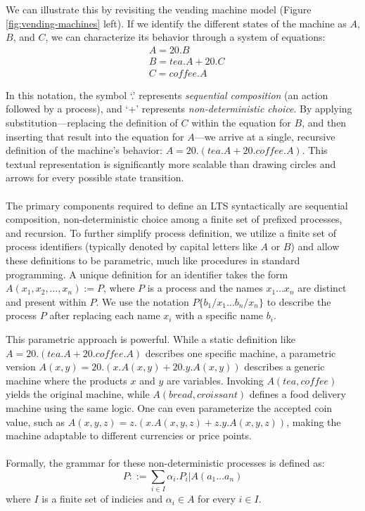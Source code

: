 We can illustrate this by revisiting the vending machine model (Figure \ref{fig:vending-machines} left). If we identify the different states of the machine as $A$, $B$, and $C$, we can characterize its behavior through a system of equations:
\begin{align*}
    &A=20.B\\
    &B=tea.A+20.C\\
    &C=coffee.A 
\end{align*}

In this notation, the symbol ‘.’ represents \textit{sequential composition} (an action followed by a process), and ‘+’ represents \textit{non-deterministic choice}. By applying substitution—replacing the definition of $C$ within the equation for $B$, and then inserting that result into the equation for $A$—we arrive at a single, recursive definition of the machine's behavior: $A=20.(tea.A+20.coffee.A)$. This textual representation is significantly more scalable than drawing circles and arrows for every possible state transition.\\\\
The primary components required to define an LTS syntactically are sequential composition, non-deterministic choice among a finite set of prefixed processes, and recursion. To further simplify process definition, we utilize a finite set of process identifiers (typically denoted by capital letters like $A$ or $B$) and allow these definitions to be parametric, much like procedures in standard programming. A unique definition for an identifier takes the form $A(x_1,x_2,\ldots,x_n):=P$, where $P$ is a process and the names $x_1\ldots x_n$ are distinct and present within $P$. We use the notation $P\{b_1/x_1\ldots b_n/x_n\}$ to describe the process $P$ after replacing each name $x_i$ with a specific name $b_i$.

This parametric approach is powerful. While a static definition like $A=20.(tea.A+20.coffee.A)$ describes one specific machine, a parametric version $A(x,y)=20.(x.A(x,y)+20.y.A(x,y))$ describes a generic machine where the products $x$ and $y$ are variables. Invoking $A(tea,coffee)$ yields the original machine, while $A(bread,croissant)$ defines a food delivery machine using the same logic. One can even parameterize the accepted coin value, such as $A(x,y,z)=z.(x.A(x,y,z)+z.y.A(x,y,z))$, making the machine adaptable to different currencies or price points.\\\\
Formally, the grammar for these non-deterministic processes is defined as:
\begin{equation}
    P::=\sum_{i\in I}\alpha_i.P_i|A(a_1\ldots a_n)    
\end{equation}
where $I$ is a finite set of indicies and $\alpha_i\in A$ for every $i\in I$.

